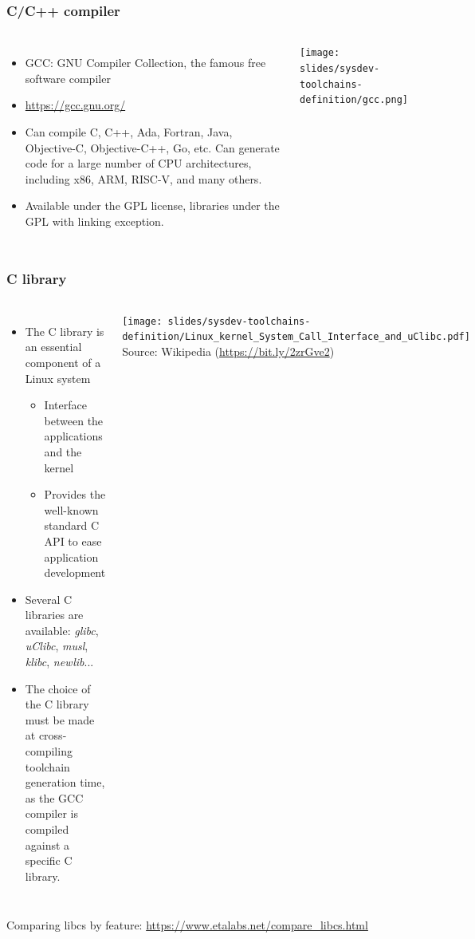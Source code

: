 \begin{frame}
  \frametitle{C/C++ compiler}
  \begin{columns}
    \begin{itemize}
    \item GCC: GNU Compiler Collection, the famous free software compiler
    \item \url{https://gcc.gnu.org/}
    \item Can compile C, C++, Ada, Fortran, Java, Objective-C,
      Objective-C++, Go, etc. Can generate code for a large number of CPU
      architectures, including x86, ARM, RISC-V, and many others.
    \item Available under the GPL license, libraries under the GPL with
      linking exception.
    \end{itemize}
    \texttt{[image: slides/sysdev-toolchains-definition/gcc.png]}
  \end{columns}
\end{frame}

\begin{frame}
  \frametitle{C library}
  \begin{columns}
    \begin{itemize}
    \item The C library is an essential component of a Linux system
      \begin{itemize}
      \item Interface between the applications and the kernel
      \item Provides the well-known standard C API to ease application
        development
      \end{itemize}
    \item Several C libraries are available:
      {\em glibc}, {\em uClibc}, {\em musl}, {\em klibc}, {\em
        newlib}...
    \item The choice of the C library must be made at
      cross-compiling toolchain generation time, as the GCC compiler is
      compiled against a specific C library.
    \end{itemize}
    \texttt{[image: slides/sysdev-toolchains-definition/Linux\_kernel\_System\_Call\_Interface\_and\_uClibc.pdf]}\\
    {\tiny Source: Wikipedia (\url{https://bit.ly/2zrGve2})}
  \end{columns}
  Comparing libcs by feature: \url{https://www.etalabs.net/compare_libcs.html}
\end{frame}

